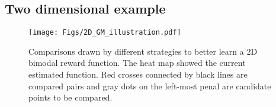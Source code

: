 \subsection{Two dimensional example}
\begin{figure}[htp]
    \centering
    \texttt{[image: Figs/2D\_GM\_illustration.pdf]}
    \caption{\small Comparisons drawn by different strategies to better learn a 2D bimodal reward function. The heat map showed the current estimated function. Red crosses connected by black lines are compared pairs and gray dots on the left-most penal are candidate points to be compared.}
    \label{fig:what_were_compared-big}
\end{figure}

\newpage